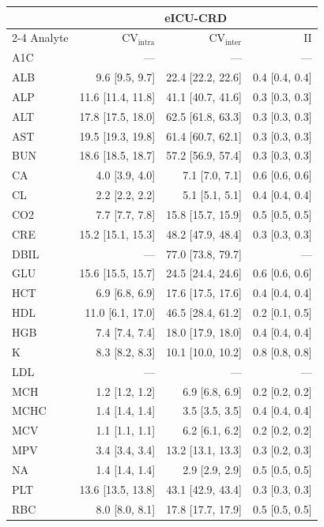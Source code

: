 \begin{table}[ht]
\centering
\tiny
\begin{tabular}{lrrr}
\toprule
  & \multicolumn{3}{c}{eICU-CRD} \\
\cmidrule(lr){2-4}
Analyte & CV$_{\text{intra}}$ & CV$_{\text{inter}}$ & II \\
\midrule
A1C & --- & --- & --- \\
ALB & 9.6 [9.5, 9.7] & 22.4 [22.2, 22.6] & 0.4 [0.4, 0.4] \\
ALP & 11.6 [11.4, 11.8] & 41.1 [40.7, 41.6] & 0.3 [0.3, 0.3] \\
ALT & 17.8 [17.5, 18.0] & 62.5 [61.8, 63.3] & 0.3 [0.3, 0.3] \\
AST & 19.5 [19.3, 19.8] & 61.4 [60.7, 62.1] & 0.3 [0.3, 0.3] \\
BUN & 18.6 [18.5, 18.7] & 57.2 [56.9, 57.4] & 0.3 [0.3, 0.3] \\
CA & 4.0 [3.9, 4.0] & 7.1 [7.0, 7.1] & 0.6 [0.6, 0.6] \\
CL & 2.2 [2.2, 2.2] & 5.1 [5.1, 5.1] & 0.4 [0.4, 0.4] \\
CO2 & 7.7 [7.7, 7.8] & 15.8 [15.7, 15.9] & 0.5 [0.5, 0.5] \\
CRE & 15.2 [15.1, 15.3] & 48.2 [47.9, 48.4] & 0.3 [0.3, 0.3] \\
DBIL & --- & 77.0 [73.8, 79.7] & --- \\
GLU & 15.6 [15.5, 15.7] & 24.5 [24.4, 24.6] & 0.6 [0.6, 0.6] \\
HCT & 6.9 [6.8, 6.9] & 17.6 [17.5, 17.6] & 0.4 [0.4, 0.4] \\
HDL & 11.0 [6.1, 17.0] & 46.5 [28.4, 61.2] & 0.2 [0.1, 0.5] \\
HGB & 7.4 [7.4, 7.4] & 18.0 [17.9, 18.0] & 0.4 [0.4, 0.4] \\
K & 8.3 [8.2, 8.3] & 10.1 [10.0, 10.2] & 0.8 [0.8, 0.8] \\
LDL & --- & --- & --- \\
MCH & 1.2 [1.2, 1.2] & 6.9 [6.8, 6.9] & 0.2 [0.2, 0.2] \\
MCHC & 1.4 [1.4, 1.4] & 3.5 [3.5, 3.5] & 0.4 [0.4, 0.4] \\
MCV & 1.1 [1.1, 1.1] & 6.2 [6.1, 6.2] & 0.2 [0.2, 0.2] \\
MPV & 3.4 [3.4, 3.4] & 13.2 [13.1, 13.3] & 0.3 [0.2, 0.3] \\
NA & 1.4 [1.4, 1.4] & 2.9 [2.9, 2.9] & 0.5 [0.5, 0.5] \\
PLT & 13.6 [13.5, 13.8] & 43.1 [42.9, 43.4] & 0.3 [0.3, 0.3] \\
RBC & 8.0 [8.0, 8.1] & 17.8 [17.7, 17.9] & 0.5 [0.5, 0.5] \\

\end{tabular}
\end{table}
